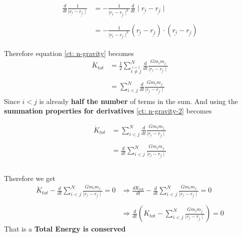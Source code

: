 \begin{note}
	\begin{align*}
		\frac{d}{dt}\frac{1}{\mid \underline{r_i} - \underline{r_j} \mid} & = - \frac{1}{\mid \underline{r_i} - \underline{r_j}\mid^{2}}\frac{d}{dt}\mid \underline{r_i} - \underline{r_j} \mid                       \\ \\
		                                                                  & = - \frac{1}{\mid \underline{r_i} - \underline{r_j} \mid^3 }(\underline{r_i} - \underline{r_j}) \cdot (\underline{r_i} - \underline{r_j})
	\end{align*}
\end{note}

Therefore equation \eqref{ct: n-gravity} becomes
\begin{align*}
  \dot{K}_{tot} & = \frac{1}{2}\sum_{\stackrel{i=1}{i \neq j}}^{N} \frac{d}{dt}\frac{Gm_i m_j}{\mid \underline{r_i} - \underline{r_j} \mid}      \\ \\
	        & = \sum_{i < j}^{N} \frac{d}{dt}\frac{Gm_i m_j}{\mid \underline{r_i} - \underline{r_j} \mid} \tag{$**$} \label{ct: n-gravity-2}
\end{align*}
Since $i<j$ is already {\bf half the number} of terms in the sum. \clearpage And using the {\bf summation properties for derivatives} \eqref{ct: n-gravity-2} becomes

\begin{align*}
  \dot{K}_{tot} & = \sum_{i < j}^{N} \frac{d}{dt}\frac{Gm_i m_j}{\mid \underline{r_i} - \underline{r_j} \mid} \\ \\
  &= \frac{d}{dt}\sum_{i < j}^{N} \frac{Gm_i m_j}{\mid \underline{r_i} - \underline{r_j} \mid} \\ \\
\end{align*}

Therefore we get
\begin{align*}
  \dot{K}_{tot} - \frac{d}{dt}\sum_{i < j}^{N} \frac{Gm_i m_j}{\mid \underline{r_i} - \underline{r_j} \mid}  = 0 & \Rightarrow \frac{dK_{tot}}{dt} -  \frac{d}{dt}\sum_{i < j}^{N} \frac{Gm_i m_j}{\mid \underline{r_i} - \underline{r_j} \mid} = 0 \\ \\
                                                                                                        & \Rightarrow \frac{d}{dt}\left( K_{tot} - \sum_{i < j}^{N} \frac{Gm_i m_j}{\mid \underline{r_i} - \underline{r_j} \mid}  \right) = 0 
\end{align*}
That is a {\bf Total Energy is conserved}

